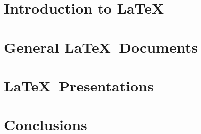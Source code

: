 \newpage
\setcounter{page}{1}      %

\part{Introduction to \LaTeX}



\part{General \LaTeX~Documents}






\part{\LaTeX~Presentations}

\part{Conclusions}


\setcounter{originalpagenumber}{\number\value{page}} %

%
\setcounter{page}{\number\value{originalpagenumber}} %



